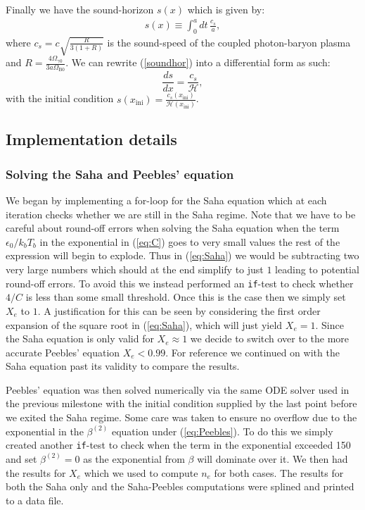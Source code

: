 \documentclass[%
reprint,
 amsmath,amssymb,
 aps,
]{revtex4-2}
\newcommand{\Hp}{\mathcal{H}}
\begin{document}
Finally we have the sound-horizon $s(x)$ which is given by:
\begin{align}
	s(x)\equiv\int_0^adt\,\frac{c_s}{a}, \label{soundhor}
\end{align}
where $c_s=c\sqrt{\frac{R}{3(1+R)}}$ is the sound-speed of the coupled photon-baryon plasma and $R=\frac{4\Omega_{\gamma0}}{3a\Omega_{\text{B}0}}$. We can rewrite (\ref{soundhor}) into a differential form as such:
\begin{equation}
	\frac{ds}{dx}=\frac{c_s}{\Hp},
\end{equation}
with the initial condition $s(x_{\text{ini}})=\frac{c_s(x_{\text{ini}})}{\Hp(x_{\text{ini}})}$. 



\subsection{Implementation details}
\subsubsection{Solving the Saha and Peebles' equation}
We began by implementing a for-loop for the Saha equation which at each iteration checks whether we are still in the Saha regime. Note that we have to be careful about round-off errors when solving the Saha equation when the term $\epsilon_0/k_bT_b$ in the exponential in (\ref{eq:C}) goes to very small values the rest of the expression will begin to explode. Thus in (\ref{eq:Saha}) we would be subtracting two very large numbers which should at the end simplify to just $1$ leading to potential round-off errors. To avoid this we instead performed an \texttt{if}-test to check whether $4/C$ is less than some small threshold. Once this is the case then we simply set $X_e$ to $1$. A justification for this can be seen by considering the first order expansion of the square root in (\ref{eq:Saha}), which will just yield $X_e=1$. Since the Saha equation is only valid for $X_e\approx1$ we decide to switch over to the more accurate Peebles' equation $X_e<0.99$. For reference we continued on with the Saha equation past its validity to compare the results. 

Peebles' equation was then solved numerically via the same ODE solver used in the previous milestone with the initial condition supplied by the last point before we exited the Saha regime. Some care was taken to ensure no overflow due to the exponential in the $\beta^{(2)}$ equation under (\ref{eq:Peebles}). To do this we simply created another \texttt{if}-test to check when the term in the exponential exceeded 150 and set $\beta^{(2)}=0$ as the exponential from $\beta$ will dominate over it. We then had the results for $X_e$ which we used to compute $n_e$ for both cases. The results for both the Saha only and the Saha-Peebles computations were splined and printed to a data file.
\end{document}
